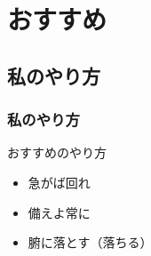 \documentclass[12pt, dvipdfmx]{beamer}
\begin{document}
\section{おすすめ}

\subsection{私のやり方}
\begin{frame}
    \frametitle{私のやり方}
    \begin{block}{おすすめのやり方}
        \begin{itemize}
            \item 急がば回れ
            \item 備えよ常に
            \item 腑に落とす（落ちる）
        \end{itemize}
    \end{block}
\end{frame}
\end{document}
